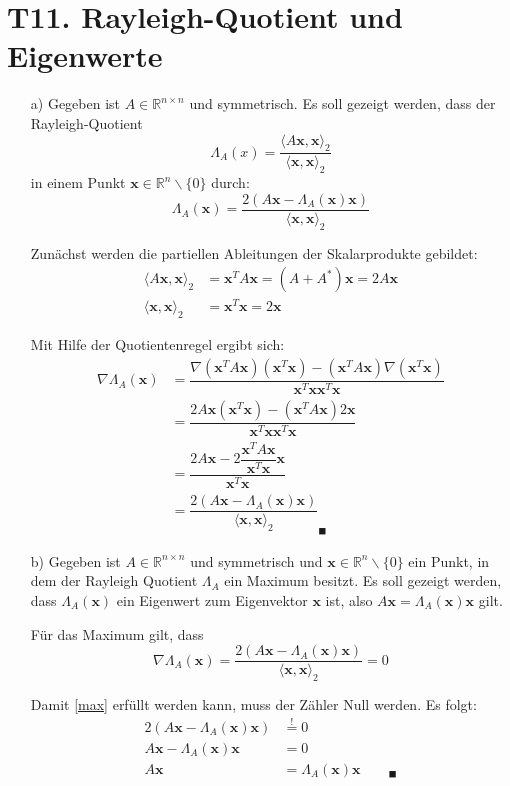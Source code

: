 \documentclass[11pt]{article}
\theoremstyle{plain}
\theoremstyle{definition}
\let\mbb\boldsymbol
\renewcommand\boldsymbol{\mbb}
\renewcommand{\a}{\"{a}}
\renewcommand{\u}{\"{u}}
\newcommand{\beequal}{\mathop{=}\limits^!}
\newcommand{\ray}{\Lambda_A(\mbb{x})}
\newcommand{\dray}{\nabla \Lambda_A(\mbb{x})}
\begin{document}
\section*{T11. Rayleigh-Quotient und Eigenwerte}
\begin{itemize}
\item[a)]
Gegeben ist $A \in \mathbb{R}^{n \times n}$ und symmetrisch. Es soll gezeigt werden, dass der Rayleigh-Quotient
\begin{equation}
\Lambda_A(x) = \frac{\langle A\mbb{x},\mbb{x}\rangle_2}{\langle \mbb{x},\mbb{x}\rangle_2} 
\end{equation}
in einem Punkt $\mbb{x}\in \mathbb{R}^n \backslash \{0\}$ durch:
\begin{equation}
\ray = \frac{2(A\mbb{x} - \ray \mbb{x})}{\langle \mbb{x},\mbb{x}\rangle_2}
\end{equation}

Zun\a chst werden die partiellen Ableitungen der Skalarprodukte gebildet:
\begin{align}
\langle A\mbb{x},\mbb{x}\rangle_2 &= \mbb{x}^TA\mbb{x}  = (A+A^*)\mbb{x} = 2A\mbb{x} \\
\langle \mbb{x},\mbb{x}\rangle_2 &= \mbb{x}^T\mbb{x} = 2\mbb{x} 
\end{align}

Mit Hilfe der Quotientenregel ergibt sich:
\begin{align}
\dray 
&= \dfrac{\nabla(\mbb{x}^TA\mbb{x}) (\mbb{x}^T\mbb{x}) - (\mbb{x}^TA\mbb{x}) \nabla(\mbb{x}^T\mbb{x})}{\mbb{x}^T\mbb{x}\mbb{x}^T\mbb{x}} \\
&= \dfrac{2A\mbb{x}(\mbb{x}^T\mbb{x}) - (\mbb{x}^TA\mbb{x})2\mbb{x} }{\mbb{x}^T\mbb{x}\mbb{x}^T\mbb{x}} \\
&= \dfrac{2A\mbb{x} - 2\dfrac{\mbb{x}^TA\mbb{x}}{\mbb{x}^T\mbb{x}}\mbb{x}}{\mbb{x}^T\mbb{x}} \\ 
&= \dfrac{2(A\mbb{x} - \ray \mbb{x})}{\langle \mbb{x},\mbb{x}\rangle_2} _\blacksquare
\end{align}

\item[b)]
Gegeben ist $A \in \mathbb{R}^{n \times n}$ und symmetrisch und $\mbb{x}\in \mathbb{R}^n \backslash \{0\}$ ein Punkt, in dem der Rayleigh Quotient $\Lambda_A$ ein Maximum besitzt. Es soll gezeigt werden, dass $\Lambda_A(\mbb{x})$ ein Eigenwert zum Eigenvektor $\mbb{x}$ ist, also $A\mbb{x} = \ray \mbb{x}$ gilt.

F\u r das Maximum gilt, dass
\begin{equation}
\dray = \frac{2(A\mbb{x} - \ray \mbb{x})}{\langle \mbb{x},\mbb{x}\rangle_2} = 0
\label{max}
\end{equation}

Damit \eqref{max} erf\u llt werden kann, muss der Z\a hler Null werden. Es folgt:
\begin{align}
2(A\mbb{x} - \ray \mbb{x}) &\beequal 0 \\
A\mbb{x} - \ray \mbb{x} &= 0\\
A\mbb{x} &= \ray \mbb{x} \qquad_\blacksquare
\end{align}

\end{itemize}
\end{document}
